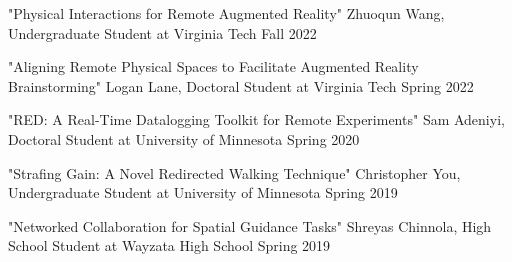 
\begin{cventries}

  \cventry
    {"Physical Interactions for Remote Augmented Reality"} %
    {Zhuoqun Wang, Undergraduate Student at Virginia Tech} %
    {Fall 2022} %
    {} %
    {}
    \vspace{-0.15in}

  \cventry
    {"Aligning Remote Physical Spaces to Facilitate Augmented Reality Brainstorming"} %
    {Logan Lane, Doctoral Student at Virginia Tech} %
    {Spring 2022} %
    {} %
    {}
    \vspace{-0.15in}
    
  \cventry
    {"RED: A Real-Time Datalogging Toolkit for Remote Experiments"} %
    {Sam Adeniyi, Doctoral Student at University of Minnesota} %
    {Spring 2020} %
    {} %
    {}
    \vspace{-0.15in}
    
  \cventry
    {"Strafing Gain: A Novel Redirected Walking Technique"} %
    {Christopher You, Undergraduate Student at University of Minnesota} %
    {Spring 2019} %
    {} %
    {}
    \vspace{-0.15in}
    
  \cventry
    {"Networked Collaboration for Spatial Guidance Tasks"} %
    {Shreyas Chinnola, High School Student at Wayzata High School} %
    {Spring 2019} %
    {} %
    {}
    \vspace{-0.15in}
\end{cventries}
